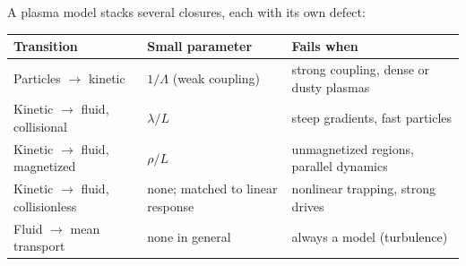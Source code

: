 A plasma model stacks several closures, each with its own defect:
\begin{center}
\renewcommand{\arraystretch}{1.3}
\begin{tabularx}{\textwidth}{@{}P{4.2cm}P{4.2cm}Y@{}}
\toprule
Transition & Small parameter & Fails when \\
\midrule
Particles $\to$ kinetic & $1/\Lambda$ (weak coupling)
   & strong coupling, dense or dusty plasmas \\
Kinetic $\to$ fluid, collisional & $\lambda/L$
   & steep gradients, fast particles \\
Kinetic $\to$ fluid, magnetized & $\rho/L$
   & unmagnetized regions, parallel dynamics \\
Kinetic $\to$ fluid, collisionless & none; matched to linear response
   & nonlinear trapping, strong drives \\
Fluid $\to$ mean transport & none in general
   & always a model (turbulence) \\
\bottomrule
\end{tabularx}
\end{center}
